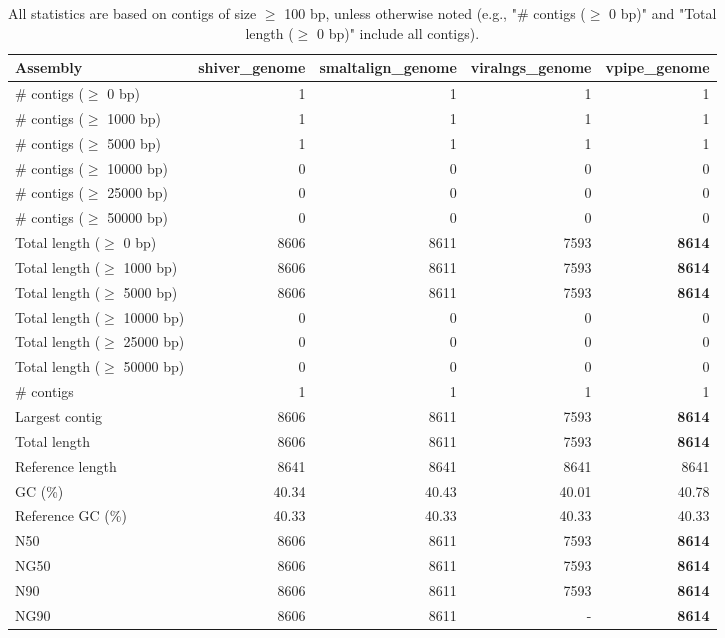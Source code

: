 \documentclass[12pt,a4paper]{article}
\begin{document}
\begin{table}[ht]
\begin{center}
\caption{All statistics are based on contigs of size $\geq$ 100 bp, unless otherwise noted (e.g., "\# contigs ($\geq$ 0 bp)" and "Total length ($\geq$ 0 bp)" include all contigs).}
\begin{tabular}{|l*{4}{|r}|}
\hline
Assembly & shiver\_genome & smaltalign\_genome & viralngs\_genome & vpipe\_genome \\ \hline
\# contigs ($\geq$ 0 bp) & 1 & 1 & 1 & 1 \\ \hline
\# contigs ($\geq$ 1000 bp) & 1 & 1 & 1 & 1 \\ \hline
\# contigs ($\geq$ 5000 bp) & 1 & 1 & 1 & 1 \\ \hline
\# contigs ($\geq$ 10000 bp) & 0 & 0 & 0 & 0 \\ \hline
\# contigs ($\geq$ 25000 bp) & 0 & 0 & 0 & 0 \\ \hline
\# contigs ($\geq$ 50000 bp) & 0 & 0 & 0 & 0 \\ \hline
Total length ($\geq$ 0 bp) & 8606 & 8611 & 7593 & {\bf 8614} \\ \hline
Total length ($\geq$ 1000 bp) & 8606 & 8611 & 7593 & {\bf 8614} \\ \hline
Total length ($\geq$ 5000 bp) & 8606 & 8611 & 7593 & {\bf 8614} \\ \hline
Total length ($\geq$ 10000 bp) & 0 & 0 & 0 & 0 \\ \hline
Total length ($\geq$ 25000 bp) & 0 & 0 & 0 & 0 \\ \hline
Total length ($\geq$ 50000 bp) & 0 & 0 & 0 & 0 \\ \hline
\# contigs & 1 & 1 & 1 & 1 \\ \hline
Largest contig & 8606 & 8611 & 7593 & {\bf 8614} \\ \hline
Total length & 8606 & 8611 & 7593 & {\bf 8614} \\ \hline
Reference length & 8641 & 8641 & 8641 & 8641 \\ \hline
GC (\%) & 40.34 & 40.43 & 40.01 & 40.78 \\ \hline
Reference GC (\%) & 40.33 & 40.33 & 40.33 & 40.33 \\ \hline
N50 & 8606 & 8611 & 7593 & {\bf 8614} \\ \hline
NG50 & 8606 & 8611 & 7593 & {\bf 8614} \\ \hline
N90 & 8606 & 8611 & 7593 & {\bf 8614} \\ \hline
NG90 & 8606 & 8611 & - & {\bf 8614} \\ \hline

\end{tabular}
\end{center}
\end{table}
\end{document}
